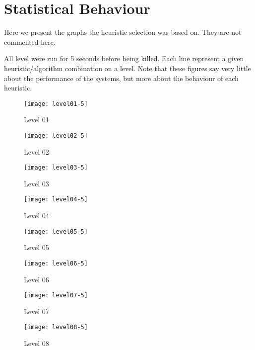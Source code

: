\chapter{Statistical Behaviour}
\label{app:results}
Here we present the graphs the heuristic selection was based on. They
are not commented here.

All level were run for 5 seconds before being killed. Each line
represent a given heuristic/algorithm combination on a level. Note
that these figures say very little about the performance of the
systems, but more about the behaviour of each heuristic.


\begin{figure}
  \centering
  \texttt{[image: level01-5]}
  \caption{Level 01}
  \label{fig:level01-stats}
\end{figure}
 
\begin{figure}
  \centering
  \texttt{[image: level02-5]}
  \caption{Level 02}
  \label{fig:level02-stats}
\end{figure}

\begin{figure}
  \centering
  \texttt{[image: level03-5]}
  \caption{Level 03}
  \label{fig:level03-stats}
\end{figure}
 
\begin{figure}
  \centering
  \texttt{[image: level04-5]}
  \caption{Level 04}
  \label{fig:level04-stats}
\end{figure}

\begin{figure}
  \centering
  \texttt{[image: level05-5]}
  \caption{Level 05}
  \label{fig:level05-stats}
\end{figure}
 
\begin{figure}
  \centering
  \texttt{[image: level06-5]}
  \caption{Level 06}
  \label{fig:level06-stats}
\end{figure}

\begin{figure}
  \centering
  \texttt{[image: level07-5]}
  \caption{Level 07}
  \label{fig:level07-stats}
\end{figure}
 
\begin{figure}
  \centering
  \texttt{[image: level08-5]}
  \caption{Level 08}
  \label{fig:level08-stats}
\end{figure}

